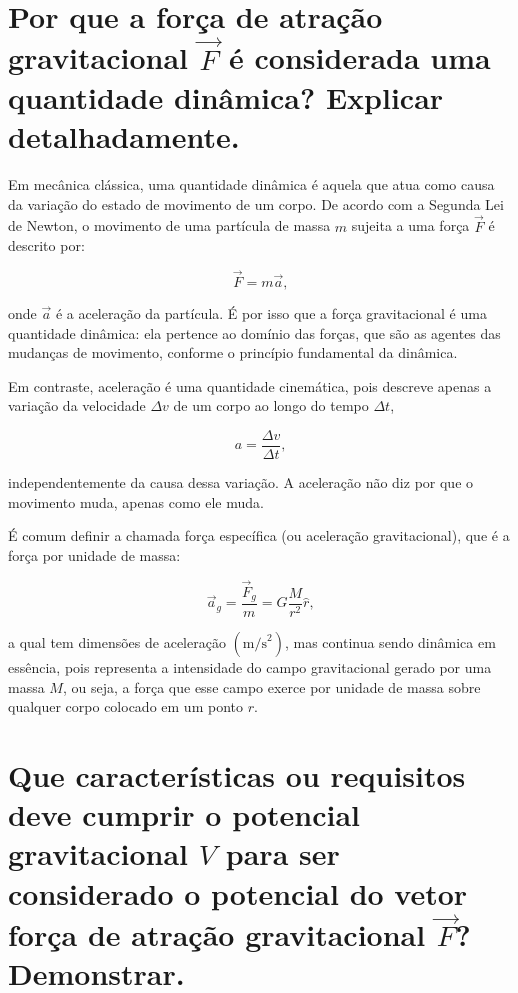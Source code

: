 

\section{Por que a força de atração gravitacional $\vec{F}$ é considerada uma quantidade dinâmica? Explicar detalhadamente.}


Em mecânica clássica, uma quantidade dinâmica é aquela que atua como causa da variação do estado de movimento de um corpo. De acordo com a Segunda Lei de Newton, o movimento de uma partícula de massa \( m \) sujeita a uma força \( \vec{F} \) é descrito por:

\[
\vec{F} = m \vec{a} \text{,}
\]

\noindent
onde \( \vec{a} \) é a aceleração da partícula. É por isso que a força gravitacional é uma quantidade dinâmica: ela pertence ao domínio das forças, que são as agentes das mudanças de movimento, conforme o princípio fundamental da dinâmica.

Em contraste, aceleração é uma quantidade cinemática, pois descreve apenas a variação da velocidade \(\Delta v\) de um corpo ao longo do tempo \(\Delta t\),

\[
a = \frac{\Delta v}{\Delta t} \text{,}
\]

\noindent
independentemente da causa dessa variação. A aceleração não diz por que o movimento muda, apenas como ele muda.

É comum definir a chamada força específica (ou aceleração gravitacional), que é a força por unidade de massa:

\[
\vec{a}_g = \frac{\vec{F}_g}{m} = G \frac{M}{r^2} \hat{r} \text{,}
\]


\noindent
a qual tem dimensões de aceleração \((\text{m/s}^2)\), mas continua sendo dinâmica em essência, pois representa a intensidade do campo gravitacional gerado por uma massa \(M\), ou seja, a força que esse campo exerce por unidade de massa sobre qualquer corpo colocado em um ponto \(r\).



\section{Que características ou requisitos deve cumprir o potencial gravitacional $V$ para ser considerado o potencial do vetor força de atração gravitacional $\vec{F}$? Demonstrar.}

